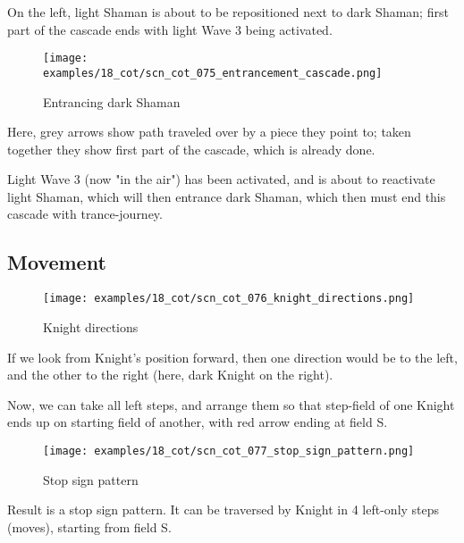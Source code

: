On the left, light Shaman is about to be repositioned next to dark Shaman; first
part of the cascade ends with light Wave 3 being activated.

\vspace*{5.3\baselineskip}

\noindent
\begin{wrapfigure}[11]{l}{0.4\textwidth}
\centering
\texttt{[image: examples/18\_cot/scn\_cot\_075\_entrancement\_cascade.png]}
\vspace*{-0.4\baselineskip}
\caption{Entrancing dark Shaman}
\label{fig:scn_cot_075_entrancement_cascade}
\end{wrapfigure}
Here, grey arrows show path traveled over by a piece they point to; taken together
they show first part of the cascade, which is already done.

Light Wave 3 (now "in the air") has been activated, and is about to reactivate
light Shaman, which will then entrance dark Shaman, which then must end this
cascade with trance-journey.

\clearpage %

\subsection*{Movement}
\label{sec:Conquest of Tlalocan/Trance-journey/Movement}

\noindent
\begin{wrapfigure}[10]{l}{0.4\textwidth}
\centering
\texttt{[image: examples/18\_cot/scn\_cot\_076\_knight\_directions.png]}
\vspace*{-0.4\baselineskip}
\caption{Knight directions}
\label{fig:scn_cot_076_knight_directions}
\end{wrapfigure}
If we look from Knight's position forward, then one direction would be to
the left, and the other to the right (here, dark Knight on the right).

Now, we can take all left steps, and arrange them so that step-field of one
Knight ends up on starting field of another, with red arrow ending at field S.


\vspace*{3.7\baselineskip}
\noindent
\begin{wrapfigure}[12]{l}{0.4\textwidth}
\centering
\texttt{[image: examples/18\_cot/scn\_cot\_077\_stop\_sign\_pattern.png]}
\vspace*{-0.4\baselineskip}
\caption{Stop sign pattern}
\label{fig:scn_cot_077_stop_sign_pattern}
\end{wrapfigure}
Result is a stop sign pattern. It can be traversed by Knight in 4 left-only
steps (moves), starting from field S.

